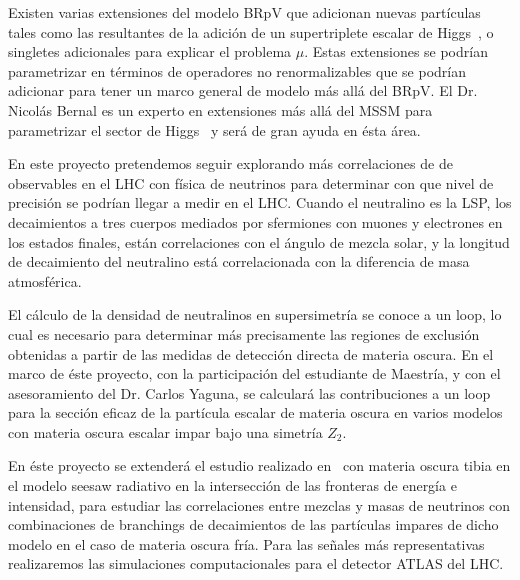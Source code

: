 \begin{bbrpvlhc}
  Existen varias extensiones del modelo BRpV que adicionan nuevas
  partículas tales como las resultantes de la adición de un
  supertriplete escalar de Higgs~\cite{}, o singletes adicionales para
  explicar el problema $\mu$. Estas extensiones se podrían
  parametrizar en términos de operadores no renormalizables que se
  podrían adicionar para tener un marco general de modelo más allá del
  BRpV. El Dr. Nicolás Bernal es un experto en extensiones más allá
  del MSSM para parametrizar el sector de Higgs~\cite{} y será de gran
  ayuda en ésta área.
\end{bbrpvlhc}

\begin{brpvlhc}
  En este proyecto pretendemos seguir explorando más correlaciones de
  de observables en el LHC con física de neutrinos para determinar con
  que nivel de precisión se podrían llegar a medir en el LHC. Cuando
  el neutralino es la LSP, los decaimientos a tres cuerpos mediados
  por sfermiones con muones y electrones en los estados finales, están
  correlaciones con el ángulo de mezcla solar, y la longitud de
  decaimiento del neutralino está correlacionada con la diferencia de
  masa atmosférica.
\end{brpvlhc}


\begin{darkmatter}
  El cálculo de la densidad de neutralinos en supersimetría se conoce
  a un loop, lo cual es necesario para determinar más precisamente las
  regiones de exclusión obtenidas a partir de las medidas de detección
  directa de materia oscura. En el marco de éste proyecto,
  con la participación del estudiante de Maestría, y con el
  asesoramiento del Dr. Carlos Yaguna, se 
  calculará las contribuciones a un loop para la sección eficaz de la
  partícula escalar de materia oscura en varios  modelos con materia oscura
  escalar impar bajo una simetría $Z_2$.

  En éste proyecto se extenderá el estudio realizado
  en~\cite{Sierra:2008wj} con materia oscura tibia en el modelo seesaw
  radiativo en la intersección de las fronteras de energía e
  intensidad, para estudiar las correlaciones entre mezclas y masas de
  neutrinos con combinaciones de branchings de decaimientos de las
  partículas impares de dicho modelo en el caso de materia oscura
  fría. Para las señales más representativas realizaremos las
  simulaciones computacionales para el detector ATLAS del LHC.
\end{darkmatter}



